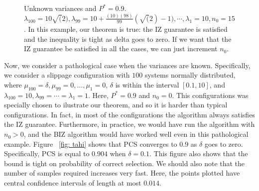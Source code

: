 \documentclass{wscpaperproc}
\theoremstyle{wsc}
\begin{document}
\begin{figure}
\begin{subfigure}[b]{0.4\textwidth}
    \end{subfigure}
    \caption{Unknown variances and $P^*=0.9$. $\lambda_{100}=10\sqrt(2),\lambda_{99}=10+\frac{(10)(98)}{99}(\sqrt(2)-1),\cdots,\lambda_{1}=10,n_{0}=15$.
    In this example, our theorem is true: the IZ guarantee is satisfied and the inequality is tight as delta goes to zero. If we want that the IZ guarantee be 
    satisfied in all the cases, we can just increment $n_{0}$.
    \label{fig: tahi2}}
\end{figure}  

 Now, we consider a pathological case when the variances are known. Specifically, we consider a slippage configuration 
with $100$ systems normally distributed, where $\mu_{100}=\delta,\mu_{99}=0,\dots,\mu_{1}=0$, $\delta$ is 
within the interval $[0.1,10]$, and $\lambda_{100}=10,\lambda_{99}=\cdots=\lambda_{1}=1$. Here, $P^*=0.9$ and $n_{0}=0$.
This configurations was specially chosen to ilustrate our theorem, and so it is harder than typical configurations.
In fact, in most of the configurations the algorithm always satisfies the IZ guarantee. Furthermore, in practice, we would
have run the algorithm with $n_{0}>0$, and the BIZ algorithm would have worked well even in this pathological example. 
Figure ~\ref{fig: tahi} shows that PCS converges to $0.9$ as $\delta$ goes to zero. Specifically, PCS is equal to $0.904$ when $\delta=0.1$.
This figure also shows that the bound is tight  on probability of correct selection. We should also note that the number of samples required increases very fast. 
Here, the points plotted have central confidence intervals of length at most $0.014$. 
\end{document}
